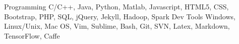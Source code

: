 \begin{cvskills}
    \cvskill
    {Programming}
    {C/C++, Java, Python, Matlab, Javascript, HTML5, CSS, Bootstrap, PHP, SQL, jQuery, Jekyll, Hadoop, Spark}
    \cvskill
    {Dev Tools}
    {Windows, Linux/Unix, Mac OS, Vim, Sublime, Bash, Git, SVN, Latex, Markdown, TensorFlow, Caffe}
\end{cvskills}
